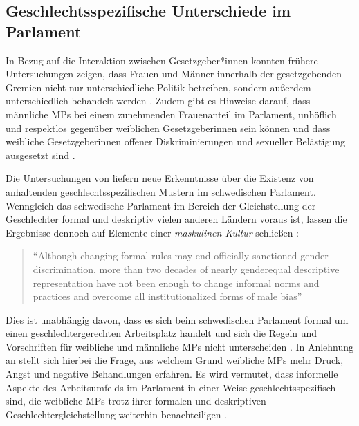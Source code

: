 \documentclass[12pt, 
    twoside=false, 
    bibliography=totoc, 
    numbers=endperiod, 
    headings=normal, 
    toc=chapterentrydotfill
    ]{scrbook}
\begin{document}
\subsection{Geschlechtsspezifische Unterschiede im Parlament}\label{kapitel:geschlechterunterschiede}

In Bezug auf die Interaktion zwischen Gesetzgeber*innen konnten frühere Untersuchungen zeigen, dass Frauen und Männer innerhalb der gesetzgebenden Gremien nicht nur unterschiedliche Politik betreiben, sondern außerdem unterschiedlich behandelt werden \parencites[201]{erikson_2018}{childs_2004}. Zudem gibt es Hinweise darauf, dass männliche MPs bei einem zunehmenden Frauenanteil im Parlament, unhöflich und respektlos gegenüber weiblichen Gesetzgeberinnen sein können \parencites[201]{erikson_2018}{kathlene_1994} und dass weibliche Gesetzgeberinnen offener Diskriminierungen und sexueller Belästigung ausgesetzt sind \parencites[201]{erikson_2018}[76]{lovenduski_2005}{lovenduski_2004}.

Die Untersuchungen von \textcite{erikson_2018} liefern neue Erkenntnisse über die Existenz von anhaltenden geschlechtsspezifischen Mustern im schwedischen Parlament. Wenngleich das schwedische Parlament im Bereich der Gleichstellung der Geschlechter formal und deskriptiv vielen anderen Ländern voraus ist, lassen die Ergebnisse dennoch auf Elemente einer \emph{maskulinen Kultur} schließen \parencite[211]{erikson_2018}:

\citereset
\begin{quote}
    \enquote{Although changing formal rules may end officially sanctioned gender discrimination, more than two decades of nearly genderequal descriptive representation have not been enough to change informal norms and practices and overcome all institutionalized forms of male bias} \parencite[211]{erikson_2018}
\end{quote}

 Dies ist unabhängig davon, dass es sich beim schwedischen Parlament formal um einen geschlechtergerechten Arbeitsplatz handelt und sich die Regeln und Vorschriften für weibliche und männliche MPs nicht unterscheiden \parencite[211]{erikson_2018}. In Anlehnung an \citeauthor{erikson_2018} stellt sich hierbei die Frage, aus welchem Grund weibliche MPs mehr Druck, Angst und negative Behandlungen erfahren. Es wird vermutet, dass informelle Aspekte des Arbeitsumfelds im Parlament in einer Weise geschlechtsspezifisch sind, die weibliche MPs trotz ihrer formalen und deskriptiven Geschlechtergleichstellung weiterhin benachteiligen \parencite[210]{erikson_2018}.
\end{document}
